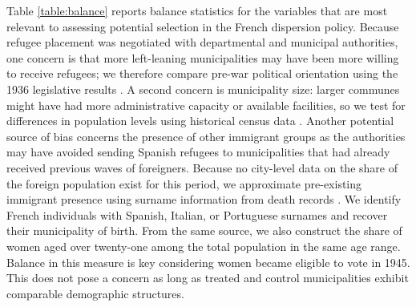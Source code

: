 



Table \ref{table:balance} reports balance statistics for the variables that are most relevant to assessing potential selection in the French dispersion policy. Because refugee placement was negotiated with departmental and municipal authorities, one concern is that more left-leaning municipalities may have been more willing to receive refugees; we therefore compare pre-war political orientation using the 1936 legislative results \citep{piketty_histoire_2023}. A second concern is municipality size: larger communes might have had more administrative capacity or available facilities, so we test for differences in population levels using historical census data \citep{insee_pop_hist_comm}. Another potential source of bias concerns the presence of other immigrant groups as the authorities may have avoided sending Spanish refugees to municipalities that had already received previous waves of foreigners. Because no city-level data on the share of the foreign population exist for this period, we approximate pre-existing immigrant presence using surname information from death records \citep{insee_deces_2025}. We identify French individuals with Spanish, Italian, or Portuguese surnames and recover their municipality of birth. From the same source, we also construct the share of women aged over twenty-one among the total population in the same age range. Balance in this measure is key considering women became eligible to vote in 1945. This does not pose a concern as long as treated and control municipalities exhibit comparable demographic structures.

